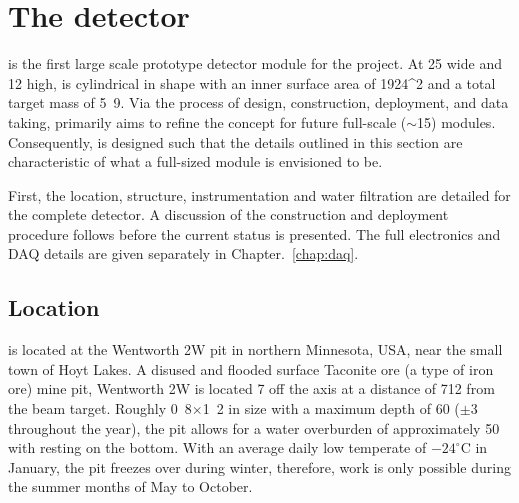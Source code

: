 \section{The \chipsfive detector} %
\label{sec:chips_detector} %

\chipsfive is the first large scale prototype detector module for the \chips project. At
\unit{25}{} wide and \unit{12}{} high, \chipsfive is cylindrical in shape with
an inner surface area of \unit{1924}{^2} and a total target mass of
\unit{5.9}{}. Via the process of design, construction, deployment, and data taking,
\chipsfive primarily aims to refine the \chips concept for future full-scale
($\sim$\unit{15}{}) modules. Consequently, \chipsfive is designed such that the
details outlined in this section are characteristic of what a full-sized \chips module is
envisioned to be.

First, the location, structure, instrumentation and water filtration are detailed for the complete
detector. A discussion of the construction and deployment procedure follows before the current
status is presented. The full electronics and DAQ details are given separately in
Chapter.~\ref{chap:daq}.

\subsection{Location} %
\label{sec:chips_detector_location} %

\chipsfive is located at the Wentworth 2W pit in northern Minnesota, USA, near the small town of
Hoyt Lakes. A disused and flooded surface Taconite ore (a type of iron ore) mine pit, Wentworth 2W
is located \unit{7}{} off the \numi axis at a distance of \unit{712}{}
from the beam target. Roughly \unit{0.8}{}$\times$\unit{1.2}{} in size with
a maximum depth of \unit{60}{} ($\pm$\unit{3}{} throughout the year), the pit
allows for a water overburden of approximately \unit{50}{} with \chipsfive resting on
the bottom. With an average daily low temperate of $-24^{\circ}\mathrm{C}$ in January, the pit
freezes over during winter, therefore, work is only possible during the summer months of May to
October.

